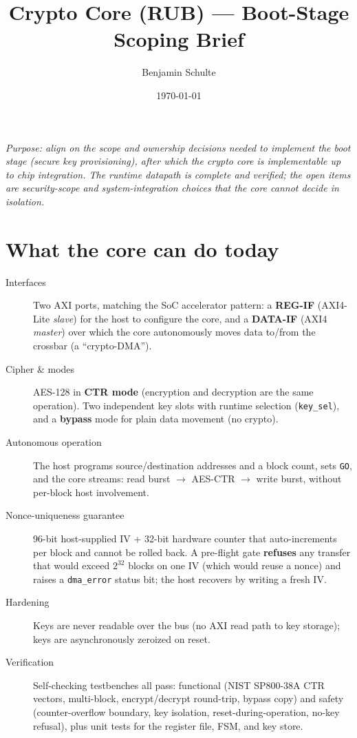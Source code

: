 \documentclass[11pt,a4paper]{article}
\title{\vspace{-1.5cm}Crypto Core (RUB) --- Boot-Stage Scoping Brief}
\author{Benjamin Schulte}
\date{\today}
\newcommand{\code}[1]{\texttt{#1}}
\begin{document}
\maketitle
\vspace{-0.6cm}

\noindent\textit{Purpose: align on the scope and ownership decisions needed to implement the boot
stage (secure key provisioning), after which the crypto core is implementable up to chip
integration. The runtime datapath is complete and verified; the open items are security-scope
and system-integration choices that the core cannot decide in isolation.}

\section{What the core can do today}

\begin{description}
  \item[Interfaces] Two AXI ports, matching the SoC accelerator pattern:
    a \textbf{REG-IF} (AXI4-Lite \emph{slave}) for the host to configure the core, and a
    \textbf{DATA-IF} (AXI4 \emph{master}) over which the core autonomously moves data
    to/from the crossbar (a ``crypto-DMA'').
  \item[Cipher \& modes] AES-128 in \textbf{CTR mode} (encryption and decryption are the same
    operation). Two independent key slots with runtime selection (\code{key\_sel}), and a
    \textbf{bypass} mode for plain data movement (no crypto).
  \item[Autonomous operation] The host programs source/destination addresses and a block count,
    sets \code{GO}, and the core streams: read burst $\rightarrow$ AES-CTR $\rightarrow$ write burst,
    without per-block host involvement.
  \item[Nonce-uniqueness guarantee] 96-bit host-supplied IV + 32-bit hardware counter that
    auto-increments per block and cannot be rolled back. A pre-flight gate \textbf{refuses} any
    transfer that would exceed $2^{32}$ blocks on one IV (which would reuse a nonce) and raises a
    \code{dma\_error} status bit; the host recovers by writing a fresh IV.
  \item[Hardening] Keys are never readable over the bus (no AXI read path to key storage);
    keys are asynchronously zeroized on reset.
  \item[Verification] Self-checking testbenches all pass: functional (NIST SP800-38A CTR vectors,
    multi-block, encrypt/decrypt round-trip, bypass copy) and safety (counter-overflow boundary,
    key isolation, reset-during-operation, no-key refusal), plus unit tests for the register file,
    FSM, and key store.
\end{description}
\end{document}
